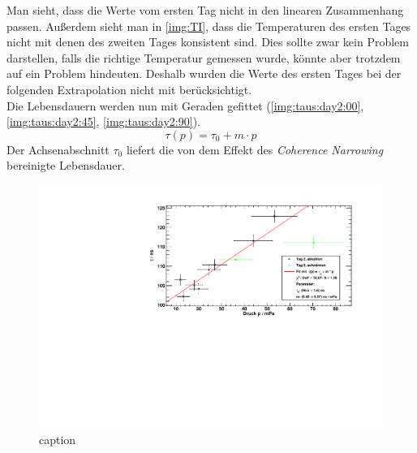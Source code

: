 Man sieht, dass die Werte vom ersten Tag nicht in den linearen Zusammenhang passen. Außerdem 
sieht man in \autoref{img:TI}, dass die Temperaturen des ersten Tages nicht mit denen des zweiten Tages konsistent sind. Dies sollte zwar kein 
Problem darstellen, falls die richtige Temperatur gemessen wurde, könnte aber trotzdem auf ein Problem hindeuten. Deshalb wurden die Werte des 
ersten Tages bei der folgenden Extrapolation nicht mit berücksichtigt. \\
Die Lebensdauern werden nun mit Geraden gefittet (\autoref{img:taus:day2:00}, \autoref{img:taus:day2:45}, \autoref{img:taus:day2:90}).
\begin{equation}
  \tau(p) = \tau_0 + m \cdot p
\end{equation}
Der Achsenabschnitt $\tau_0$ liefert die von dem Effekt des \emph{Coherence Narrowing} bereinigte Lebensdauer.

\begin{figure}[H]
\begin{center}
  \includegraphics[width=\textwidth]{../img/taus_00_day2.pdf}
  \caption{caption}
  \label{img:taus:day2:00}
\end{center}
\end{figure}

